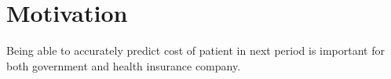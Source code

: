 
\chapter*{Motivation}

Being able to accurately predict cost of patient in next period is important for both government and health insurance company.